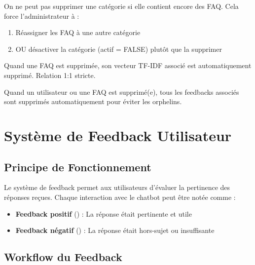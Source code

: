 \documentclass[11pt,a4paper]{article}
\begin{document}
\begin{info}
On ne peut pas supprimer une catégorie si elle contient encore des FAQ. Cela force l'administrateur à :
\begin{enumerate}
    \item Réassigner les FAQ à une autre catégorie
    \item OU désactiver la catégorie (actif = FALSE) plutôt que la supprimer
\end{enumerate}
\end{info}

\begin{info}
Quand une FAQ est supprimée, son vecteur TF-IDF associé est automatiquement supprimé. Relation 1:1 stricte.
\end{info}

\begin{info}
Quand un utilisateur ou une FAQ est supprimé(e), tous les feedbacks associés sont supprimés automatiquement pour éviter les orphelins.
\end{info}

\clearpage

\section{Système de Feedback Utilisateur}
\label{sec:feedback}

\subsection{Principe de Fonctionnement}

Le système de feedback permet aux utilisateurs d'évaluer la pertinence des réponses reçues. Chaque interaction avec le chatbot peut être notée comme :

\begin{itemize}
    \item \textbf{Feedback positif} (\faThumbsUp) : La réponse était pertinente et utile
    \item \textbf{Feedback négatif} (\faThumbsDown) : La réponse était hors-sujet ou insuffisante
\end{itemize}

\subsection{Workflow du Feedback}
\end{document}
